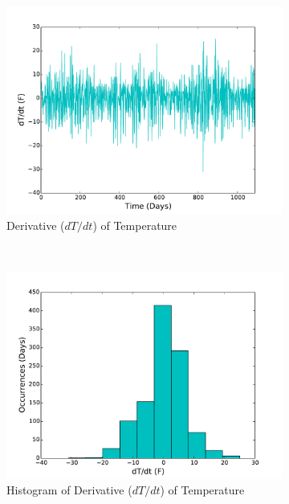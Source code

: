 \documentclass[11pt, letterpaper]{article}
\begin{document}
\begin{figure}[H]
\begin{subfigure}[b]{0.45\textwidth}
    \includegraphics[width=\textwidth]{figures/average_daily_vel.pdf}
    \caption{\label{fig:analysis-autocorr} Derivative ($dT/dt$) of Temperature}
  \end{subfigure}
  ~
  \begin{subfigure}[b]{0.45\textwidth}
    \includegraphics[width=\textwidth]{figures/average_daily_vel_hist.pdf}
    \caption{\label{fig:analysis-autocorr} Histogram of Derivative ($dT/dt$) of Temperature}
  \end{subfigure}
  \label{fig:analysis}
  \caption{}
\end{figure}
\end{document}
